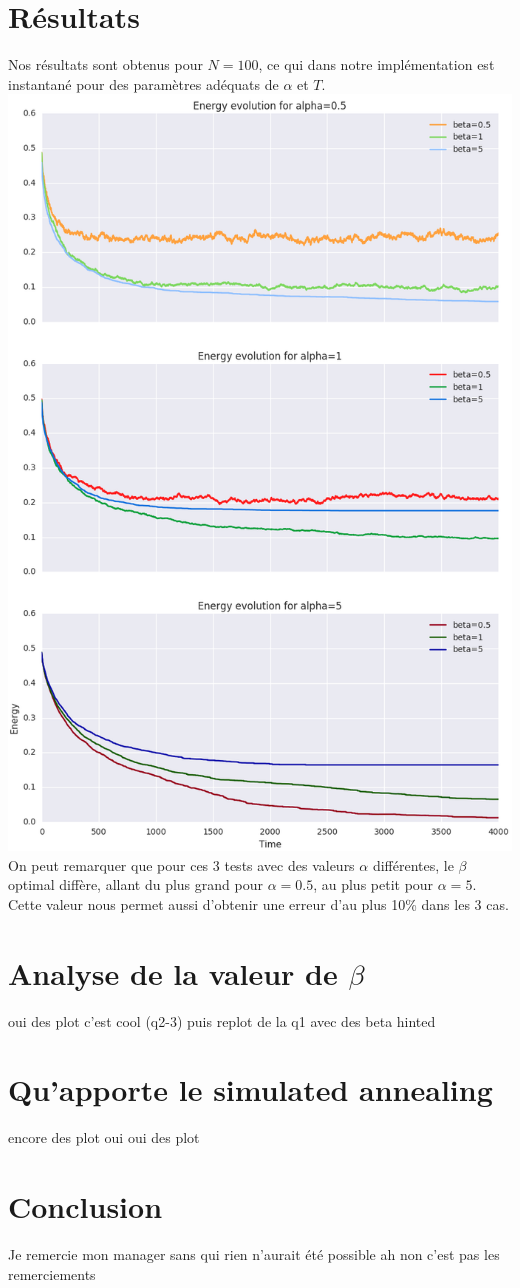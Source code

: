 \documentclass[twocolumn]{article}
\begin{document}
	\section{Résultats}
		Nos résultats sont obtenus pour $N=100$, ce qui dans notre implémentation est instantané pour des paramètres adéquats de $\alpha$ et $T$.
		\includegraphics[width=\columnwidth]{../tobekept/ex1_1755923751722050074-r.png}
		On peut remarquer que pour ces 3 tests avec des valeurs $\alpha$ différentes, le $\beta$ optimal diffère, allant du plus grand pour $\alpha = 0.5$, au plus petit pour $\alpha = 5$.
		Cette valeur nous permet aussi d'obtenir une erreur d'au plus 10\% dans les 3 cas.
	\section{Analyse de la valeur de $\beta$}
		oui des plot c'est cool (q2-3)
		puis replot de la q1 avec des beta hinted
	\section{Qu'apporte le simulated annealing}
		encore des plot oui oui des plot
		
		
	\section{Conclusion}
		Je remercie mon manager sans qui rien n'aurait été possible ah non c'est pas les remerciements
\end{document}
